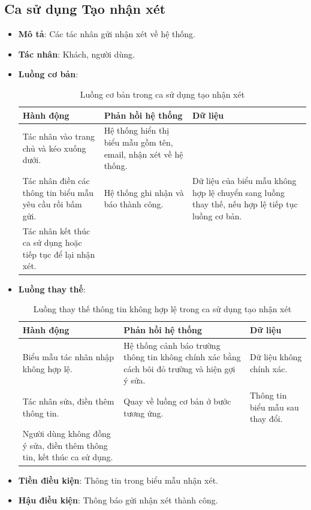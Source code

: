 \documentclass[./../main.tex]{subfiles}
\begin{document}
\subsection{Ca sử dụng Tạo nhận xét}
\begin{itemize}
    \item \textbf{Mô tả}: Các tác nhân gửi nhận xét về hệ thống.
    \item \textbf{Tác nhân}: Khách, người dùng.
    \item \textbf{Luồng cơ bản}:
    \begin{table}[H]
    \caption{\label{uc-33}Luồng cơ bản trong ca sử dụng tạo nhận xét}
    \begin{tabularx}{\textwidth}{| X | X | X |}
        \hline
        \textbf{Hành động} & \textbf{Phản hồi hệ thống} & \textbf{Dữ liệu} 
        \\ \hline
        Tác nhân vào trang chủ và kéo xuống dưới. & Hệ thống hiển thị biểu mẫu gồm tên, email, nhận xét về hệ thống. & 
        \\ \hline
        Tác nhân điền các thông tin biểu mẫu yêu cầu rồi bấm gửi. & Hệ thống ghi nhận và báo thành công. & Dữ liệu của biểu mẫu không hợp lệ chuyển sang luồng thay thế, nếu hợp lệ tiếp tục luồng cơ bản.
        \\ \hline
        Tác nhân kết thúc ca sử dụng hoặc tiếp tục để lại nhận xét. & &
        \\ \hline
    \end{tabularx}
    \end{table}    
    \item \textbf{Luồng thay thế}: 
        \begin{table}[H]
        \caption{\label{uc-34}Luồng thay thế thông tin không hợp lệ trong ca sử dụng tạo nhận xét}
        \begin{tabularx}{\textwidth}{| X | X | X |}
            \hline
            \textbf{Hành động} & \textbf{Phản hồi hệ thống} & \textbf{Dữ liệu} \\ \hline
            Biểu mẫu tác nhân nhập không hợp lệ. & Hệ thống cảnh báo trường thông tin không chính xác bằng cách bôi đỏ trường và hiện gợi ý sửa. & Dữ liệu không chính xác.
            \\ \hline
            Tác nhân sửa, điền thêm thông tin. & Quay về luồng cơ bản ở bước tương ứng. & Thông tin biểu mẫu sau thay đổi.
            \\ \hline
            Người dùng không đồng ý sửa, điền thêm thông tin, kết thúc ca sử dụng. & & 
            \\ \hline
        \end{tabularx}
        \end{table}
    \item \textbf{Tiền điều kiện}: Thông tin trong biểu mẫu nhận xét.
    \item \textbf{Hậu điều kiện}: Thông báo gửi nhận xét thành công.
\end{itemize}
\end{document}
